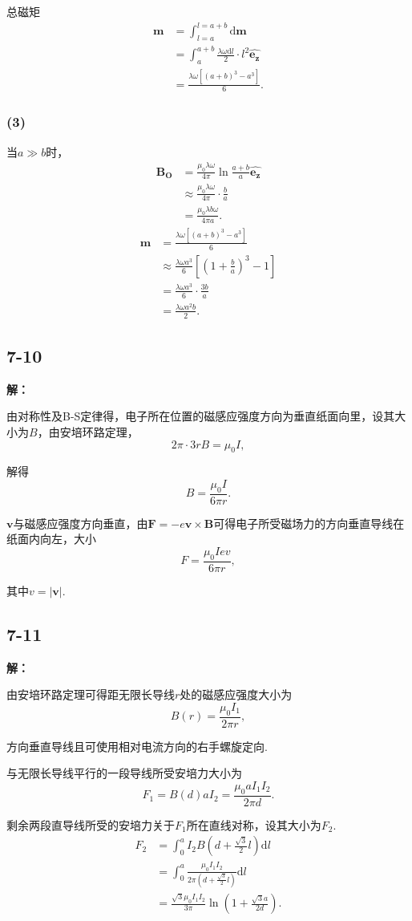 \documentclass[twocolumn]{ctexart}
\newcommand{\sol}[1]{\subsection*{#1}\noindent\textbf{解：}
	
}
\begin{document}
	总磁矩
	\begin{align*}
		\mathbf m&=\int_{l=a}^{l=a+b}\mathrm d\mathbf m\\
		&=\int_{a}^{a+b}\frac{\lambda\omega\mathrm dl}{2}\cdot l^2\hat{\mathbf{e_z}}\\
		&=\frac{\lambda\omega\left[\left(a+b\right)^3-a^3\right]}{6}.
	\end{align*}
	
	
	\subsubsection*{(3)}
	当$a\gg b$时，
	\begin{align*}
		\mathbf{B_O}&=\frac{\mu_0\lambda\omega }{4\pi}\ln\frac{a+b}{a}\hat{\mathbf{e_z}}\\
		&\approx\frac{\mu_0\lambda\omega }{4\pi}\cdot\frac{b}{a}\\
		&=\frac{\mu_0\lambda b\omega }{4\pi a}.
	\end{align*}
	\begin{align*}
		\mathbf m&=\frac{\lambda\omega\left[\left(a+b\right)^3-a^3\right]}{6}\\
		&\approx\frac{\lambda\omega a^3}{6}\left[\left(1+\frac{b}{a}\right)^3-1\right]\\
		&=\frac{\lambda\omega a^3}{6}\cdot\frac{3b}{a}\\
		&=\frac{\lambda\omega a^2 b}{2}.
	\end{align*}
	
	\sol{7-10}
	由对称性及B-S定律得，电子所在位置的磁感应强度方向为垂直纸面向里，设其大小为$B$，由安培环路定理，
	$$2\pi\cdot3rB=\mu_0I,$$
	
	解得
	$$B=\frac{\mu_0I}{6\pi r}.$$
	
	$\mathbf v$与磁感应强度方向垂直，由$\mathbf F=-e\mathbf v\times\mathbf B$可得电子所受磁场力的方向垂直导线在纸面内向左，大小
	$$F=\frac{\mu_0Iev}{6\pi r},$$
	
	其中$v=\left|\mathbf v\right|$.
	
	\sol{7-11}
	
	由安培环路定理可得距无限长导线$r$处的磁感应强度大小为
	$$B(r)=\frac{\mu_0I_1}{2\pi r},$$
	
	方向垂直导线且可使用相对电流方向的右手螺旋定向.
	
	与无限长导线平行的一段导线所受安培力大小为
	$$F_1=B(d)aI_2=\frac{\mu_0aI_1I_2}{2\pi d}.$$
	
	剩余两段直导线所受的安培力关于$F_1$所在直线对称，设其大小为$F_2$.
	\begin{align*}
		F_2&=\int_{0}^{a}I_2B(d+\frac{\sqrt{3}}{2}l)\mathrm dl\\
		&=\int_{0}^{a}\frac{\mu_0I_1I_2}{2\pi \left(d+\frac{\sqrt{3}}{2}l\right)}\mathrm dl\\
		&=\frac{\sqrt{3}\mu_0I_1I_2}{3\pi}\ln\left(1+\frac{\sqrt{3}a}{2d}\right).
	\end{align*}
\end{document}
